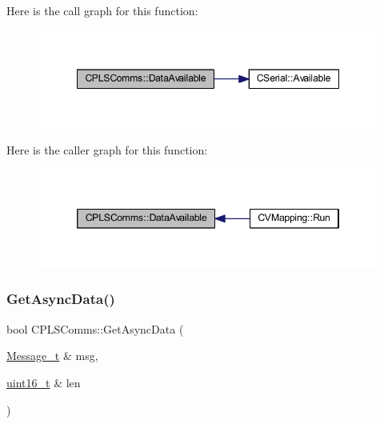 Here is the call graph for this function\+:
\nopagebreak
\begin{figure}[H]
\begin{center}
\leavevmode
\includegraphics[width=348pt]{class_c_p_l_s_comms_ae9d000eff184034954829d76162654a5_cgraph}
\end{center}
\end{figure}
Here is the caller graph for this function\+:
\nopagebreak
\begin{figure}[H]
\begin{center}
\leavevmode
\includegraphics[width=346pt]{class_c_p_l_s_comms_ae9d000eff184034954829d76162654a5_icgraph}
\end{center}
\end{figure}
\mbox{\label{class_c_p_l_s_comms_a3124eaa4549706962c7024c7c97e82b0}} 
\subsubsection{\texorpdfstring{Get\+Async\+Data()}{GetAsyncData()}}
{\footnotesize\ttfamily bool C\+P\+L\+S\+Comms\+::\+Get\+Async\+Data (\begin{DoxyParamCaption}\item[{\mbox{\hyperlink{struct_c_p_l_s_comms_1_1_message__t}{Message\+\_\+t}} \&}]{msg,  }\item[{\mbox{\hyperlink{_a_d_a_s___types_8h_a1f1825b69244eb3ad2c7165ddc99c956}{uint16\+\_\+t}} \&}]{len }\end{DoxyParamCaption})}



